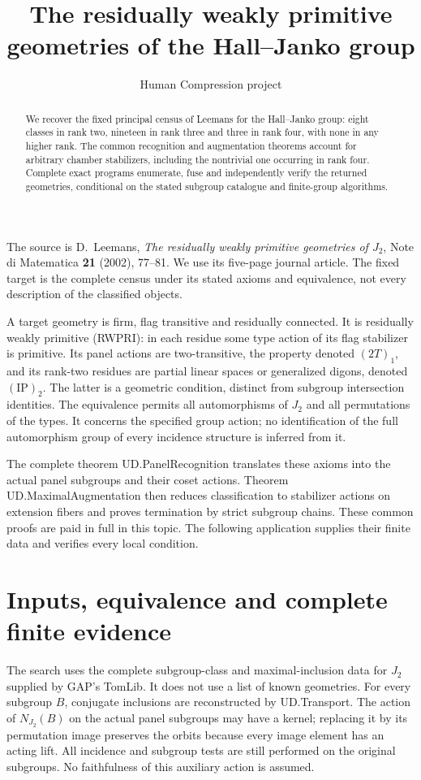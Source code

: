 
\title{The residually weakly primitive geometries of the Hall--Janko group}
\author{Human Compression project}
\date{}

\maketitle
\begin{abstract}
We recover the fixed principal census of Leemans for the Hall--Janko group:
eight classes in rank two, nineteen in rank three and three in rank four,
with none in any higher rank. The common recognition and augmentation
theorems account for arbitrary chamber stabilizers, including the nontrivial
one occurring in rank four. Complete exact programs enumerate, fuse and
independently verify the returned geometries, conditional on the stated
subgroup catalogue and finite-group algorithms.
\end{abstract}
The source is D.~Leemans, \emph{The residually weakly primitive geometries
of $J_2$}, Note di Matematica \textbf{21} (2002), 77--81. We use its five-page
journal article. The fixed target is the complete census under its stated
axioms and equivalence, not every description of the classified objects.

A target geometry is firm, flag transitive and residually connected. It is
residually weakly primitive (RWPRI): in each residue some type action of
its flag stabilizer is primitive. Its panel actions are two-transitive,
the property denoted $(2T)_1$, and its rank-two residues are partial linear
spaces or generalized digons, denoted $(\mathrm{IP})_2$. The latter is a
geometric condition, distinct from subgroup intersection identities.
The equivalence permits all automorphisms of $J_2$ and all permutations of
the types. It concerns the specified group action; no identification of the
full automorphism group of every incidence structure is inferred from it.

The complete theorem UD.PanelRecognition translates these axioms into the
actual panel subgroups and their coset actions. Theorem UD.MaximalAugmentation
then reduces classification to stabilizer actions on extension fibers and
proves termination by strict subgroup chains. These common proofs are paid
in full in this topic. The following application supplies their finite data
and verifies every local condition.


\section{Inputs, equivalence and complete finite evidence}
The search uses the complete subgroup-class and maximal-inclusion data for
$J_2$ supplied by GAP's TomLib. It does not use a list of known geometries.
For every subgroup $B$, conjugate inclusions are reconstructed by
UD.Transport. The action of $N_{J_2}(B)$ on the actual panel subgroups may
have a kernel; replacing it by its permutation image preserves the orbits
because every image element has an acting lift. All incidence and subgroup
tests are still performed on the original subgroups. No faithfulness of
this auxiliary action is assumed.

